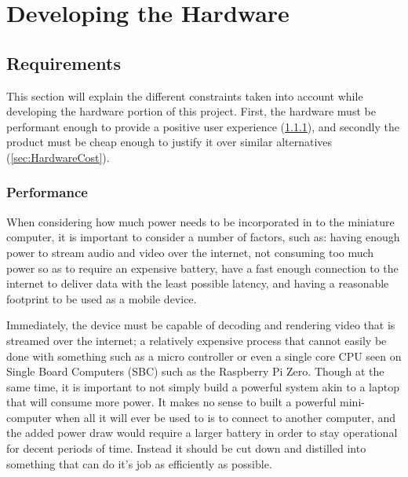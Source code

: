 \chapter{Developing the Hardware} %

\label{Chapter4} %

\todosection

\section{Requirements}\label{sec:HardwareRequirements}

This section will explain the different constraints taken into account while developing the hardware portion of this project.
First, the hardware must be performant enough to provide a positive user experience (\ref{sec:HardwarePerformance}), and secondly the product must be cheap enough to justify it over similar alternatives (\ref{sec:HardwareCost}).

\subsection{Performance}\label{sec:HardwarePerformance}

When considering how much power needs to be incorporated in to the miniature computer, it is important to consider a number of factors, such as: having enough power to stream audio and video over the internet, not consuming too much power so as to require an expensive battery, have a fast enough connection to the internet to deliver data with the least possible latency, and having a reasonable footprint to be used as a mobile device.

Immediately, the device must be capable of decoding and rendering video that is streamed over the internet; a relatively expensive process that cannot easily be done with something such as a micro controller or even a single core CPU seen on Single Board Computers (SBC) such as the Raspberry Pi Zero.
Though at the same time, it is important to not simply build a powerful system akin to a laptop that will consume more power.
It makes no sense to built a powerful mini-computer when all it will ever be used to is to connect to another computer, and the added power draw would require a larger battery in order to stay operational for decent periods of time.
Instead it should be cut down and distilled into something that can do it's job as efficiently as possible.

